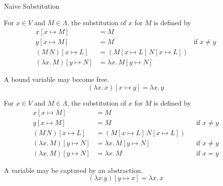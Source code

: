 \begin{frame}[allowframebreaks]{Naive Substitution}
  \begin{definition}
    For $x \in V$ and $M \in \Lambda$, the substitution of $x$ for $M$ is
    defined by
    \begin{align*}
      x[x \mapsto M] & = M \\
      y[x \mapsto M] & = M & \text{if $x \neq y$} \\
      (M\,N)[x \mapsto L] & = (M[x \mapsto L]\,N[x \mapsto L]) \\
      (\lambda x.\, M)[y \mapsto N] & = \lambda x.\, M[y \mapsto N] 
    \end{align*}
  \end{definition}
    A bound variable may become free. 
    \[
      (\lambda x.\, x)[x \mapsto y] = \lambda x.\, y
    \]
  \begin{definition}
    For $x \in V$ and $M \in \Lambda$, the substitution
    of $x$ for $M$ is defined by
    \begin{align*}
      x[x \mapsto M] & = M \\
      y[x \mapsto M] & = M && \text{if $x \neq y$} \\
      (M\,N)[x \mapsto L] & = (M[x \mapsto L]\,N[x \mapsto L]) \\
      (\lambda x.\, M)[y \mapsto N] & = \lambda x.\, M[y \mapsto N] 
                                    && \text{if $x \neq y$} \\
      (\lambda x.\, M)[y \mapsto N] & = \lambda x.\, M
                                    && \text{if $x = y$} 
    \end{align*}
  \end{definition}
    A variable may be captured by an abstraction. 
    \[
      (\lambda x. y)[y \mapsto x] = \lambda x.\, x
    \]
\end{frame}

